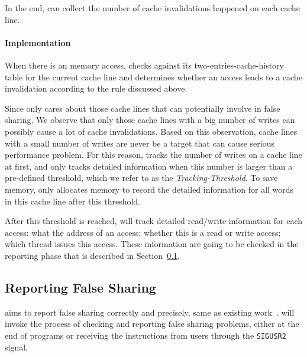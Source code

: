       
In the end, \cheetah{} can collect the number of cache invalidations happened on each cache line. 

\paragraph{Implementation} 

When there is an memory access, \Cheetah{} checks against its two-entries-cache-history table for the current cache line and determines whether an access leads to a cache invalidation according to the rule discussed above. 

Since \cheetah{} only cares about those cache lines that can potentially involve in false sharing. We observe that only those cache lines with a big number of writes can possibly cause a lot of cache invalidations. Based on this observation, cache lines with a small number of writes are never be a target that can cause serious performance problem. For this reason, \Cheetah{} tracks  the number of writes on a cache line at first, and only tracks detailed information when this number is larger than a pre-defined threshold, which we refer to as the {\it Tracking-Threshold}. To save memory, \cheetah{} only allocates memory to record the detailed information for all words in this cache line after this threshold.
 
After this threshold is reached, \Cheetah{} will track detailed read/write information for each access: what the address of an access; whether this is a read or write access; which thread issues this access. These information are going to be checked in the reporting phase that is described in Section~\ref{sec:report}. 

 \subsection{Reporting False Sharing}
\label{sec:report}

\Cheetah{} aims to report false sharing correctly and precisely, same as existing work~\cite{sheriff, Predator}. \Cheetah{} will invoke the process of checking and reporting false sharing problems, either at the end of programs or receiving the instructions from users through the \texttt{SIGUSR2} signal.  

